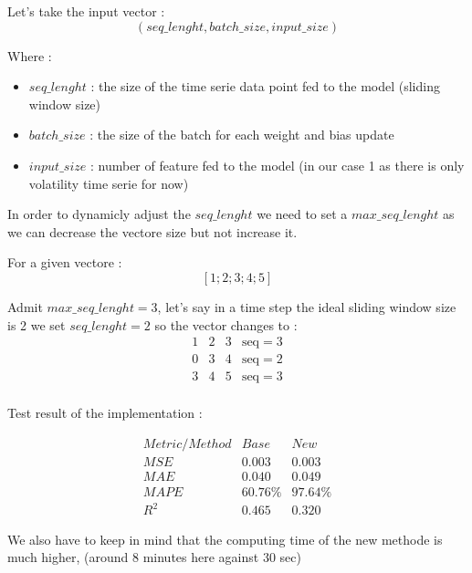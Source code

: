 \documentclass[letterpaper,11pt]{article}
\begin{document}
Let's take the input vector :
\[
(seq\_lenght, batch\_size, input\_size)
\]

Where :
\begin{itemize}
  \item $seq\_lenght$ : the size of the time serie data point fed to the model (sliding window size)
  \item $batch\_size$ : the size of the batch for each weight and bias update
  \item $input\_size$ : number of feature fed to the model (in our case 1 as there is only volatility time serie for now)
\end{itemize}

\bigskip
In order to dynamicly adjust the $seq\_lenght$ we need to set a $max\_seq\_lenght$ as we can decrease the vectore size but not increase it.

For a given vectore :
\[
[1; 2; 3; 4; 5]
\]


Admit $max\_seq\_lenght = 3 $, let's say in a time step the ideal sliding window size is 2 we set $seq\_lenght = 2$ so the vector changes to :
\[
\begin{array}{cccc}
1 & 2 & 3 & \text{seq} = 3 \\
0 & 3 & 4 & \text{seq} = 2 \\
3 & 4 & 5 & \text{seq} = 3 \\
\end{array}
\]


\bigskip

Test result of the implementation : 

\bigskip
\[
\begin{array}{ccc}
Metric/Method & Base & New \\
\hline
MSE & 0.003 & 0.003\\
MAE & 0.040 & 0.049 \\
MAPE & 60.76\% & 97.64\%  \\
R^{2} & 0.465 & 0.320 
\end{array}
\]

\bigskip


We also have to keep in mind that the computing time of the new methode is much higher, (around 8 minutes here against 30 sec)
\end{document}
